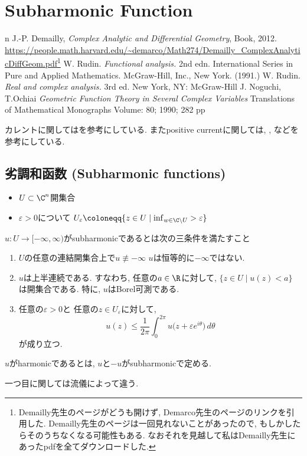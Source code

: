 \chapter{Subharmonic Function}

\begin{thebibliography}{n}
J.-P. Demailly,
\textit{Complex Analytic and Differential Geometry},
Book, 2012.
\url{https://people.math.harvard.edu/~demarco/Math274/Demailly_ComplexAnalyticDiffGeom.pdf}\footnote{Demailly先生のページがどうも開けず, Demarco先生のページのリンクを引用した. Demailly先生のページは一回見れないことがあったので, もしかしたらそのうちなくなる可能性もある. なおそれを見越して私はDemailly先生にあったpdfを全てダウンロードした.}
W. Rudin. \textit{Functional analysis.} 2nd edn. International Series in Pure and Applied Mathematics. McGraw-Hill, Inc., New York. (1991.)
W. Rudin. \textit{Real and complex analysis. } 3rd ed. New York, NY: McGraw-Hill 
J. Noguchi, T.Ochiai \textit{Geometric Function Theory in Several Complex Variables} Translations of Mathematical Monographs
Volume: 80; 1990; 282 pp
\end{thebibliography}
 
カレントに関しては\cite[Chapter 3]{NO}を参考にしている. 
またpositive currentに関しては, 
\cite[Chapter 1. Section 3.C]{Dem}, \cite[Chapter 3. Section 1.]{Dem}
などを参考にしている. 

\section{劣調和函数 (Subharmonic functions)}

\begin{itemize}
\item $U \subset \C^n $開集合
\item $\varepsilon >0$について
$
U_\varepsilon \coloneqq
\{ z \in U \mid\inf_{w \in \C \setminus U} > \varepsilon\}
$
\end{itemize}


\begin{tcolorbox}[mybox]
\begin{defn}
$u : U \to [- \infty, \infty)$がsubharmonicであるとは次の三条件を満たすこと
\begin{enumerate}
\item $U$の任意の連結開集合上で$u \not \equiv - \infty$ 
$u$は恒等的に$-\infty$ではない.

\item
$u$は上半連続である.
すなわち, 任意の$a \in \R$に対して,
\(
\{z \in U \mid u(z) < a\}
\)
は開集合である.
特に, $u$はBorel可測である.

\item
任意の$\varepsilon > 0$と
任意の$z \in U_\varepsilon$に対して,
\[
u(z)
\leq
\frac{1}{2\pi}
\int_0^{2\pi}
u\bigl(z+\varepsilon e^{i\theta}\bigr)\,d\theta
\]
が成り立つ.
\end{enumerate}
$u$がharmonicであるとは, $u$と$-u$がsubharmonicで定める. 
\end{defn}
\end{tcolorbox}
一つ目に関しては流儀によって違う. 

